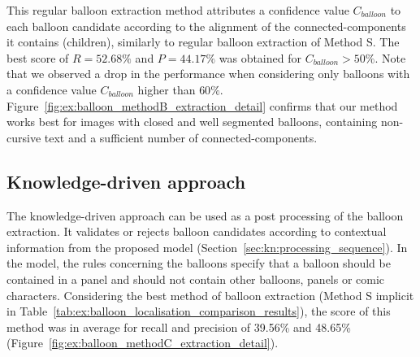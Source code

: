 
This regular balloon extraction method attributes a confidence value $C_{balloon}$ to each balloon candidate according to the alignment of the connected-components it contains (children), similarly to regular balloon extraction of Method S.
The best score of $R=52.68\%$ and $P=44.17\%$ was obtained for $C_{balloon} > 50\%$.
Note that we observed a drop in the performance when considering only balloons with a confidence value $C_{balloon}$ higher than $60\%$.
Figure~\ref{fig:ex:balloon_methodB_extraction_detail} confirms that our method works best for images with closed and well segmented balloons, containing non-cursive text and a sufficient number of connected-components.





\subsection{Knowledge-driven approach} %

The knowledge-driven approach can be used as a post processing of the balloon extraction.
It validates or rejects balloon candidates according to contextual information from the proposed model (Section~\ref{sec:kn:processing_sequence}).
In the model, the rules concerning the balloons specify that a balloon should be contained in a panel and should not contain other balloons, panels or comic characters.
Considering the best method of balloon extraction (Method S implicit in Table~\ref{tab:ex:balloon_localisation_comparison_results}), the score of this method was in average for recall and precision of 39.56\% and 48.65\% (Figure~\ref{fig:ex:balloon_methodC_extraction_detail}).

